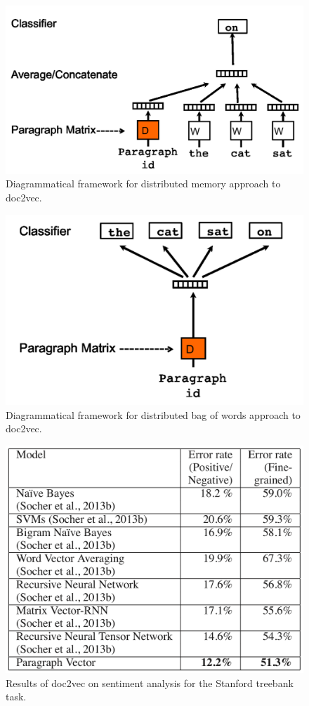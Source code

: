 \begin{figure}
\centering
  \includegraphics[width=.5\linewidth]{files/doc2vec-2.png}
  \caption{Diagrammatical framework for distributed memory approach to doc2vec.}
  \label{fig:doc2vec2}
\end{figure}

\begin{figure}
\centering
  \includegraphics[width=.5\linewidth]{files/doc2vec-3.png}
  \caption{Diagrammatical framework for distributed bag of words approach to doc2vec.}
  \label{fig:doc2vec3}
\end{figure}

\begin{figure}
\centering
  \includegraphics[width=.7\linewidth]{files/doc2vec-4.png}
  \caption{Results of doc2vec on sentiment analysis for the Stanford treebank task.}
  \label{fig:doc2vec-res1}
\end{figure}

